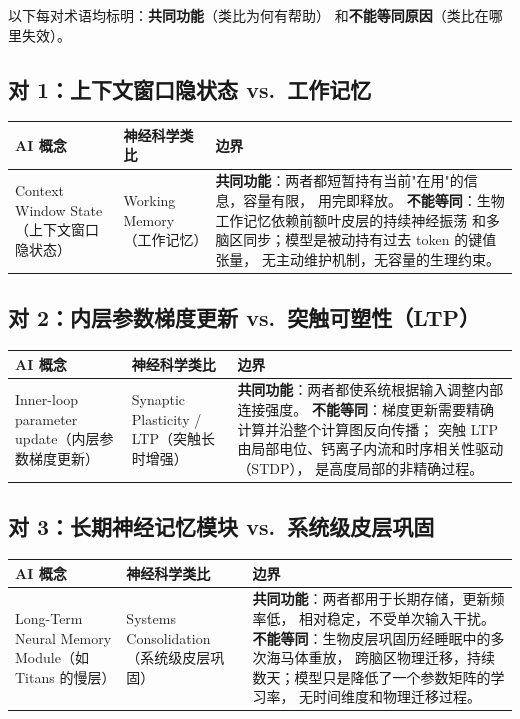 以下每对术语均标明：\textbf{共同功能}（类比为何有帮助）
和\textbf{不能等同原因}（类比在哪里失效）。

\subsection*{对 1：上下文窗口隐状态 vs.\ 工作记忆}

\begin{tabular}{p{4cm} p{3.5cm} p{6cm}}
\toprule
\textbf{AI 概念} & \textbf{神经科学类比} & \textbf{边界} \\
\midrule
Context Window State
（上下文窗口隐状态）
& Working Memory（工作记忆）
& \textbf{共同功能}：两者都短暂持有当前"在用"的信息，容量有限，
  用完即释放。
  \textbf{不能等同}：生物工作记忆依赖前额叶皮层的持续神经振荡
  和多脑区同步；模型是被动持有过去 token 的键值张量，
  无主动维护机制，无容量的生理约束。 \\
\bottomrule
\end{tabular}

\subsection*{对 2：内层参数梯度更新 vs.\ 突触可塑性（LTP）}

\begin{tabular}{p{4cm} p{3.5cm} p{6cm}}
\toprule
\textbf{AI 概念} & \textbf{神经科学类比} & \textbf{边界} \\
\midrule
Inner-loop parameter update（内层参数梯度更新）
& Synaptic Plasticity / LTP（突触长时增强）
& \textbf{共同功能}：两者都使系统根据输入调整内部连接强度。
  \textbf{不能等同}：梯度更新需要精确计算并沿整个计算图反向传播；
  突触 LTP 由局部电位、钙离子内流和时序相关性驱动（STDP），
  是高度局部的非精确过程。 \\
\bottomrule
\end{tabular}

\subsection*{对 3：长期神经记忆模块 vs.\ 系统级皮层巩固}

\begin{tabular}{p{4cm} p{3.5cm} p{6cm}}
\toprule
\textbf{AI 概念} & \textbf{神经科学类比} & \textbf{边界} \\
\midrule
Long-Term Neural Memory Module（如 Titans 的慢层）
& Systems Consolidation（系统级皮层巩固）
& \textbf{共同功能}：两者都用于长期存储，更新频率低，
  相对稳定，不受单次输入干扰。
  \textbf{不能等同}：生物皮层巩固历经睡眠中的多次海马体重放，
  跨脑区物理迁移，持续数天；模型只是降低了一个参数矩阵的学习率，
  无时间维度和物理迁移过程。 \\
\bottomrule
\end{tabular}

